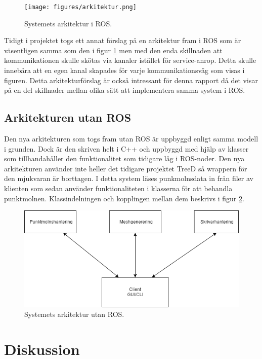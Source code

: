 \begin{figure}[h]
	\centering
	\texttt{[image: figures/arkitektur.png]}
	\caption{Systemets arkitektur i ROS.}
	\label{fig:arkitektur}
\end{figure}

Tidigt i projektet togs ett annat förslag på en arkitektur fram i ROS som är väsentligen samma som den i figur \ref{fig:arkitektur} men med den enda skillnaden att kommunikationen skulle skötas via kanaler istället för service-anrop. Detta skulle innebära att en egen kanal skapades för varje kommunikationsväg som visas i figuren. Detta arkitekturförslag är också intressant för denna rapport då det visar på en del skillnader mellan olika sätt att implementera samma system i ROS.

\subsection{Arkitekturen utan ROS}
Den nya arkitekturen som togs fram utan ROS är uppbyggd enligt samma modell i grunden. Dock är den skriven helt i C++ och uppbyggd med hjälp av klasser som tillhandahåller den funktionalitet som tidigare låg i ROS-noder. Den nya arkitekturen använder inte heller det tidigare projektet TreeD så wrappern för den mjukvaran är borttagen. I detta system läses punkmolnsdata in från filer av klienten som sedan använder funktionaliteten i klasserna för att behandla punktmolnen. Klassindelningen och kopplingen mellan dem beskrivs i figur \ref{fig:klasser}.

\begin{figure}[h]
	\centering
	\includegraphics[width=15cm]{figures/klassdiagram.png}
	\caption{Systemets arkitektur utan ROS.}
	\label{fig:klasser}
\end{figure}


\section{Diskussion}
\label{sec:discussion-lundberg}

